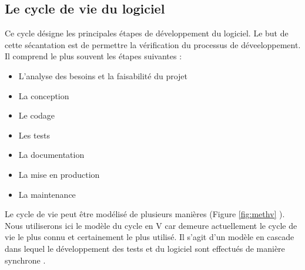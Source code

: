         \subsection{Le cycle de vie du logiciel}
        Ce cycle désigne les principales étapes de développement du logiciel.
        Le but de cette sécantation est de permettre la vérification du processus de déveeloppement.
        Il comprend le plus souvent les étapes suivantes :
        \begin{itemize}
                \item L'analyse des besoins et la faisabilité du projet
                \item La conception
                \item Le codage
                \item Les tests
                \item La documentation
                \item La mise en production
                \item La maintenance
        \end{itemize}
        Le cycle de vie peut être modélisé de plusieurs manières (Figure \ref{fig:methv} ).
        Nous utiliserons ici le modèle du cycle en V car demeure actuellement le cycle de vie le 
        plus connu et certainement le plus utilisé. 
        Il s'agit d'un modèle en cascade dans lequel le 
        développement des tests et du logiciel sont effectués 
        de manière synchrone \cite{audibert2009uml}.
